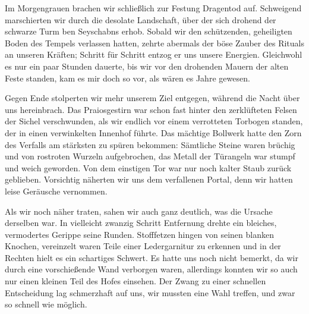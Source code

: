 Im Morgengrauen brachen wir schließlich zur Festung Dragentod auf. Schweigend marschierten wir durch die desolate Landschaft, über der sich drohend der schwarze Turm ben Seyschabns erhob. Sobald wir den schützenden, geheiligten Boden des Tempels verlassen hatten, zehrte abermals der böse Zauber des Rituals an unseren Kräften; Schritt für Schritt entzog er uns unsere Energien. Gleichwohl es nur ein paar Stunden dauerte, bis wir vor den drohenden Mauern der alten Feste standen, kam es mir doch so vor, als wären es Jahre gewesen. 


Gegen Ende stolperten wir mehr unserem Ziel entgegen, während die Nacht über uns hereinbrach. Das Praiosgestirn war schon fast hinter den zerklüfteten Felsen der Sichel verschwunden, als wir endlich vor einem verrotteten Torbogen standen, der in einen verwinkelten Innenhof führte. Das mächtige Bollwerk hatte den Zorn des Verfalls am stärksten zu spüren bekommen: Sämtliche Steine waren brüchig und von rostroten Wurzeln aufgebrochen, das Metall der Türangeln war stumpf und weich geworden. Von dem einstigen Tor war nur noch kalter Staub zurück geblieben. Vorsichtig näherten wir uns dem verfallenen Portal, denn wir hatten leise Geräusche vernommen.


Als wir noch näher traten, sahen wir auch ganz deutlich, was die Ursache derselben war. In vielleicht zwanzig Schritt Entfernung drehte ein bleiches, vermodertes Gerippe seine Runden. Stofffetzen hingen von seinen blanken Knochen, vereinzelt waren Teile einer Ledergarnitur zu erkennen und in der Rechten hielt es ein schartiges Schwert. Es hatte uns noch nicht bemerkt, da wir durch eine vorschießende Wand verborgen waren, allerdings konnten wir so auch nur einen kleinen Teil des Hofes einsehen. Der Zwang zu einer schnellen Entscheidung lag schmerzhaft auf uns, wir mussten eine Wahl treffen, und zwar so schnell wie möglich. 


